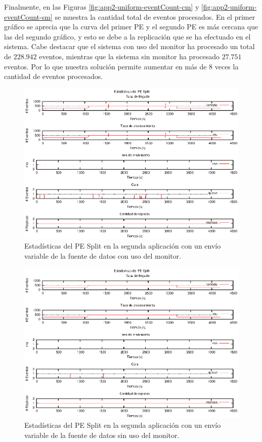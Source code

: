 Finalmente, en las Figuras \ref{fig:app2-uniform-eventCount-cm} y \ref{fig:app2-uniform-eventCount-sm} se muestra la cantidad total de eventos procesados. En el primer gráfico se aprecia que la curva del primer PE y el segundo PE es más cercana que las del segundo gráfico, y esto se debe a la replicación que se ha efectuado en el sistema. Cabe destacar que el sistema con uso del monitor ha procesado un total de $228.942$ eventos, mientras que la sistema sin monitor ha procesado $27.751$ eventos. Por lo que nuestra solución permite aumentar en más de 8 veces la cantidad de eventos procesados.

\begin{figure}[p]
\centering
    \includegraphics[scale=1.1]{images/exp/app2/normal/cm/statusSplitPE.eps}
    \caption{Estadísticas del PE Split en la segunda aplicación con un envío variable de la fuente de datos con uso del monitor.}
    \label{fig:app2-normal-statusSplitPE-cm}
\end{figure}

\begin{figure}[p]
\centering
    \includegraphics[scale=1.1]{images/exp/app2/normal/sm/statusSplitPE.eps}
    \caption{Estadísticas del PE Split en la segunda aplicación con un envío variable de la fuente de datos sin uso del monitor.}
    \label{fig:app2-normal-statusSplitPE-sm}
\end{figure}

